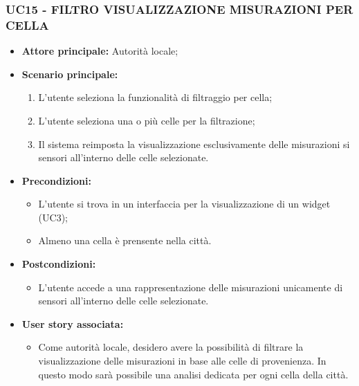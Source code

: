 \subsubsection{UC15 - FILTRO VISUALIZZAZIONE MISURAZIONI PER CELLA}
\begin{itemize}
    \item \textbf{Attore principale:} Autorità locale;
    \item \textbf{Scenario principale:}
          \begin{enumerate}
              \item L'utente seleziona la funzionalità di filtraggio per cella;
              \item L'utente seleziona una o più celle per la filtrazione;
              \item Il sistema reimposta la visualizzazione esclusivamente delle misurazioni si sensori all'interno delle celle selezionate.
          \end{enumerate}
    \item \textbf{Precondizioni:}
          \begin{itemize}
              \item  L'utente si trova in un interfaccia per la visualizzazione di un widget (UC3);
              \item Almeno una cella è prensente nella città.
          \end{itemize}
    \item \textbf{Postcondizioni:}
          \begin{itemize}
              \item  L'utente accede a una rappresentazione delle misurazioni unicamente di sensori all'interno delle celle selezionate.
          \end{itemize}
    \item \textbf{User story associata:}
          \begin{itemize}
            \item Come autorità locale, desidero avere la possibilità di filtrare la visualizzazione delle misurazioni in base alle celle di provenienza. In questo modo sarà possibile una analisi dedicata per ogni cella della città.
          \end{itemize}
\end{itemize}
